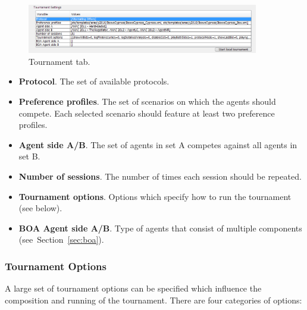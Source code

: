 \documentclass[]{article}
\begin{document}
\begin{figure}[htb]
	\centering
	\includegraphics[width=0.9\textwidth]{media/image16.png}
\caption{Tournament tab.}\label{Fig:tournament}
\end{figure}

\begin{itemize}
	\item \textbf{Protocol}. The set of available protocols.
	\item \textbf{Preference profiles}. The set of scenarios on which the agents should compete. Each selected scenario should feature at least two preference profiles.
	\item \textbf{Agent side A/B}. The set of agents in set A competes against all agents in set B.
	\item \textbf{Number of sessions}. The number of times each session should be repeated.
	\item \textbf{Tournament options}. Options which specify how to run the tournament (see below).
	\item \textbf{BOA Agent side A/B}. Type of agents that consist of multiple components (see~Section~\ref{sec:boa}).
\end{itemize}

\subsubsection{Tournament Options}
A large set of tournament options can be specified which influence the composition and running of the tournament. There are four categories of options:
\end{document}
